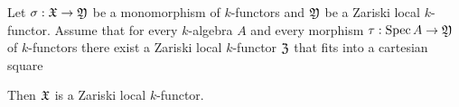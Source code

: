 \begin{proposition}\label{proposition:representable_monomorphisms_are_sheaves}
Let $\sigma:{\mathfrak X} \rightarrow {\mathfrak Y}$ be a monomorphism of $k$-functors and ${\mathfrak Y}$ be a Zariski local $k$-functor. Assume that for every $k$-algebra $A$ and every morphism $\tau:\mathrm{Spec}\, A \rightarrow {\mathfrak Y}$ of $k$-functors there exist a Zariski local $k$-functor ${\mathfrak Z}$ that fits into a cartesian square
\begin{center}
\end{center}
Then ${\mathfrak X}$ is a Zariski local $k$-functor.
\end{proposition}
